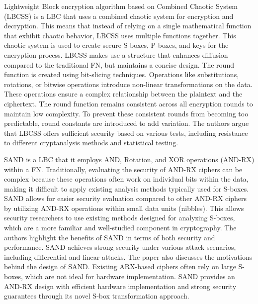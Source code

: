 \documentclass[conference]{IEEEtran}
\begin{document}
Lightweight Block encryption algorithm based on Combined Chaotic System (LBCSS) is a LBC that uses a combined chaotic system for encryption and decryption. This means that instead of relying on a single mathematical function that exhibit chaotic behavior, LBCSS uses multiple functions together. This chaotic system is used to create secure S-boxes, P-boxes, and keys for the encryption process. LBCSS makes use a structure that enhances diffusion compared to the traditional FN, but maintains a concise design. The round function is created using bit-slicing techniques. Operations like substitutions, rotations, or bitwise operations introduce non-linear transformations on the data. These operations ensure a complex relationship between the plaintext and the ciphertext. The round function remains consistent across all encryption rounds to maintain low complexity. To prevent these consistent rounds from becoming too predictable, round constants are introduced to add variation. The authors argue that LBCSS offers sufficient security based on various tests, including resistance to different cryptanalysis methods and statistical testing.\cite{LBCCS}


SAND is a LBC that it employs AND, Rotation, and XOR operations (AND-RX) within a FN. Traditionally, evaluating the security of AND-RX ciphers can be complex because these operations often work on individual bits within the data, making it difficult to apply existing analysis methods typically used for S-boxes. SAND allows for easier security evaluation compared to other AND-RX ciphers by utilizing AND-RX operations within small data units (nibbles). This allows security researchers to use existing methods designed for analyzing S-boxes, which are a more familiar and well-studied component in cryptography. The authors highlight the benefits of SAND in terms of both security and performance. SAND achieves strong security under various attack scenarios, including differential and linear attacks. The paper also discusses the motivations behind the design of SAND. Existing ARX-based ciphers often rely on large S-boxes, which are not ideal for hardware implementation. SAND provides an AND-RX design with efficient hardware implementation and strong security guarantees through its novel S-box transformation approach.\cite{SAND}
\end{document}

